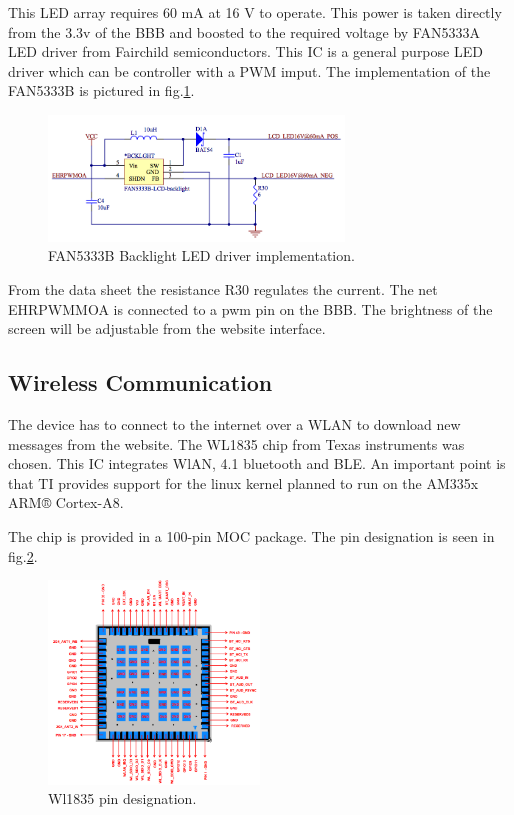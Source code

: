 This LED array requires 60 mA at 16 V to operate. This power is taken directly from the 3.3v of the BBB and boosted to the required voltage by FAN5333A LED driver from Fairchild semiconductors.
This IC is a general purpose LED driver which can be controller with a PWM imput.
The implementation of the FAN5333B is pictured in fig.\ref{fig:backlight driver schematics}.

\begin{figure}[!htb]
    \centering
    \includegraphics[width=0.7\textwidth,keepaspectratio]{chap/hardFig/backlight_led_driver_sch}
    \caption{FAN5333B Backlight LED driver implementation.}
    \label{fig:backlight driver schematics}
\end{figure}

From the data sheet the resistance R30 regulates the current. The net EHRPWMMOA is connected to a pwm pin on the BBB. The brightness of the screen will be adjustable from the website interface.


\subsection{Wireless Communication}
\label{chap:wireless com}
The device has to connect to the internet over a WLAN to download new messages from the website. The WL1835 chip from Texas instruments was chosen. This IC integrates WlAN, 4.1 bluetooth and BLE. An important point is that TI provides support for the linux kernel planned to run on the AM335x ARM® Cortex-A8.

The chip is provided in a 100-pin MOC package. The pin designation is seen in fig.\ref{fig:wl1835 pin designation}.

\begin{figure}[!htb]
    \centering
    \includegraphics[width=0.5\textwidth,keepaspectratio]{chap/hardFig/100_pin_MOC_wl1835_package}
    \caption{Wl1835 pin designation.}
    \label{fig:wl1835 pin designation}
\end{figure}

